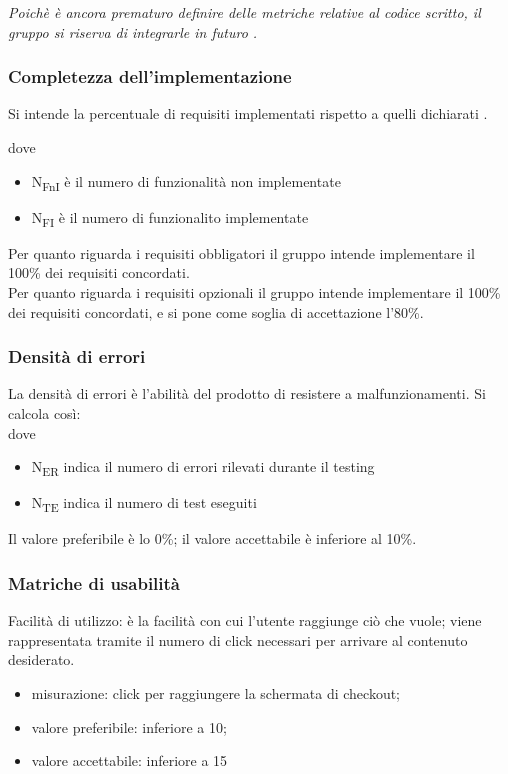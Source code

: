 \documentclass[../piano_di_qualifica.tex]{subfiles}
\begin{document}
\emph{Poichè è ancora prematuro definire delle metriche relative al codice scritto, il gruppo si riserva di integrarle in futuro .}

\subsubsection{Completezza dell'implementazione}
Si intende la percentuale di requisiti implementati rispetto a quelli dichiarati .

dove
\begin{itemize}
\item N\textsubscript{FnI} è il numero di funzionalità non implementate 
\item N\textsubscript{FI} è il numero di funzionalito implementate 
\end{itemize}

Per quanto riguarda i requisiti obbligatori il gruppo intende implementare il 100\% dei requisiti concordati. \\
Per quanto riguarda i requisiti opzionali il gruppo intende implementare il 100\% dei requisiti concordati, e si pone come soglia di accettazione l’80\%. 

\subsubsection{Densità di errori}
La densità di errori è l'abilità del prodotto di resistere a malfunzionamenti. Si calcola così:\\


dove
\begin{itemize}
\item N\textsubscript{ER} indica il numero di errori rilevati durante il testing
\item N\textsubscript{TE} indica il numero di test eseguiti
\end{itemize}

Il valore preferibile è lo 0\%; il valore accettabile è inferiore al 10\%.

\subsubsection{Matriche di usabilità}
Facilità di utilizzo: è la facilità con cui l’utente raggiunge ciò che vuole; viene rappresentata tramite il numero di click necessari per arrivare al contenuto desiderato.\\
\begin{itemize}
\item misurazione: click per raggiungere la schermata di checkout;
\item valore preferibile: inferiore a 10;
\item valore accettabile: inferiore a 15
\end{itemize}
\end{document}
